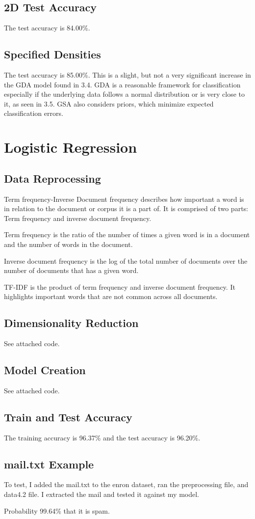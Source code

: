 \documentclass{article}
\begin{document}
\subsection{2D Test Accuracy}
The test accuracy is 84.00\%.

\subsection{Specified Densities}
The test accuracy is 85.00\%. This is a slight, but not a very significant increase in the GDA model found in 3.4. GDA is a reasonable framework for classification especially if the underlying data follows a normal distribution or is very close to it, as seen in 3.5. GSA also considers priors, which minimize expected classification errors.

\section{Logistic Regression}
\subsection{Data Reprocessing}
Term frequency-Inverse Document frequency describes how important a word is in relation to the document or corpus it is a part of. It is comprised of two parts: Term frequency and inverse document frequency.

Term frequency is the ratio of the number of times a given word is in a document and the number of words in the document.

Inverse document frequency is the log of the total number of documents over the number of documents that has a given word.

TF-IDF is the product of term frequency and inverse document frequency. It highlights important words that are not common across all documents.

\subsection{Dimensionality Reduction}
See attached code.

\subsection{Model Creation}
See attached code.

\subsection{Train and Test Accuracy}
The training accuracy is 96.37\% and the test accuracy is 96.20\%. 

\subsection{mail.txt Example}
To test, I added the mail.txt to the enron dataset, ran the preprocessing file, and data4.2 file. I extracted the mail and tested it against my model.

Probability 99.64\% that it is spam.
\end{document}
